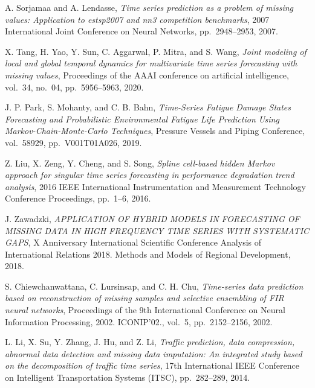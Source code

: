 \begin{enumerate}[label={[S\arabic*]}]
    A. Sorjamaa and A. Lendasse, \textit{Time series prediction as a problem of missing values: Application to estsp2007 and nn3 competition benchmarks}, 2007 International Joint Conference on Neural Networks, pp.~2948–2953, 2007.
    \item %
    X. Tang, H. Yao, Y. Sun, C. Aggarwal, P. Mitra, and S. Wang, \textit{Joint modeling of local and global temporal dynamics for multivariate time series forecasting with missing values}, Proceedings of the AAAI conference on artificial intelligence, vol.~34, no.~04, pp.~5956–5963, 2020.
    \item %
    J. P. Park, S. Mohanty, and C. B. Bahn, \textit{Time-Series Fatigue Damage States Forecasting and Probabilistic Environmental Fatigue Life Prediction Using Markov-Chain-Monte-Carlo Techniques}, Pressure Vessels and Piping Conference, vol.~58929, pp.~V001T01A026, 2019.
    \item %
    Z. Liu, X. Zeng, Y. Cheng, and S. Song, \textit{Spline cell-based hidden Markov approach for singular time series forecasting in performance degradation trend analysis}, 2016 IEEE International Instrumentation and Measurement Technology Conference Proceedings, pp.~1–6, 2016.
    \item %
    J. Zawadzki, \textit{APPLICATION OF HYBRID MODELS IN FORECASTING OF MISSING DATA IN HIGH FREQUENCY TIME SERIES WITH SYSTEMATIC GAPS}, X Anniversary International Scientific Conference Analysis of International Relations 2018. Methods and Models of Regional Development, 2018.
    \item %
    S. Chiewchanwattana, C. Lursinsap, and C. H. Chu, \textit{Time-series data prediction based on reconstruction of missing samples and selective ensembling of FIR neural networks}, Proceedings of the 9th International Conference on Neural Information Processing, 2002. ICONIP'02., vol.~5, pp.~2152–2156, 2002.
    \item %
    L. Li, X. Su, Y. Zhang, J. Hu, and Z. Li, \textit{Traffic prediction, data compression, abnormal data detection and missing data imputation: An integrated study based on the decomposition of traffic time series}, 17th International IEEE Conference on Intelligent Transportation Systems (ITSC), pp.~282–289, 2014.
\end{enumerate}
